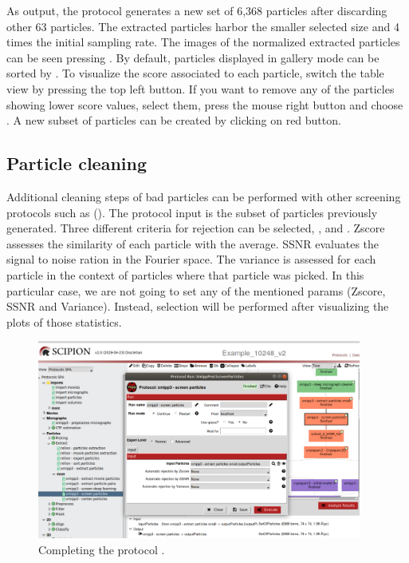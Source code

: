   As output, the protocol generates a new set of 6,368 particles after discarding other 63 particles. The extracted particles harbor the smaller selected size and 4 times the initial sampling rate. The images of the normalized extracted particles can be seen pressing . By default, particles displayed in gallery mode can be sorted by . To visualize the score associated to each particle, switch the table view by pressing the top left button. If you want to remove any of the particles showing lower score values, select them, press the mouse right button and choose . A new subset of particles can be created by clicking on  red button. 
  
  \subsection*{Particle cleaning}
  
  Additional cleaning steps of bad particles can be performed with other screening protocols such as  (). The protocol input is the subset of particles previously generated. Three different criteria for rejection can be selected, ,  and . Zscore assesses the similarity of each particle with the average. SSNR evaluates the signal to noise ration in the Fourier space. The variance is assessed for each particle in the context of particles where that particle was picked. In this particular case, we are not going to set any of the mentioned params (Zscore, SSNR and Variance). Instead, selection will be performed after visualizing the plots of those statistics. 
  
  \begin{figure}[H]
  \centering
  \captionsetup{width=.8\linewidth} 
  \includegraphics[width=0.95\textwidth]
  {images/xmipp_screen_particles.pdf}
  \caption{Completing the protocol .}
  \label{fig:xmipp_screen_particles}
  \end{figure}
  

